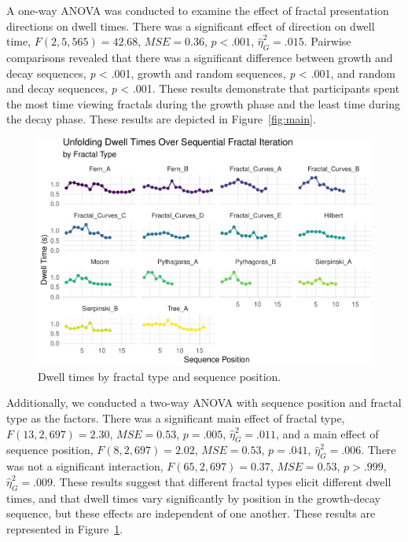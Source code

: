 \documentclass[english,jou]{apa6}
\begin{document}
A one-way ANOVA was conducted to examine the effect of fractal presentation directions on dwell times. There was a significant effect of direction on dwell time, \(F(2, 5,565) = 42.68\), \(\mathit{MSE} = 0.36\), \(p < .001\), \(\hat{\eta}^2_G = .015\). Pairwise comparisons revealed that there was a significant difference between growth and decay sequences, \emph{p} \textless{} .001, growth and random sequences, \emph{p} \textless{} .001, and random and decay sequences, \emph{p} \textless{} .001. These results demonstrate that participants spent the most time viewing fractals during the growth phase and the least time during the decay phase. These results are depicted in Figure~\ref{fig:main}.

\begin{figure}
\centering
\includegraphics{paper_papaja_files/figure-latex/ftfig-1.pdf}
\caption{\label{fig:ftfig}Dwell times by fractal type and sequence position.}
\end{figure}

Additionally, we conducted a two-way ANOVA with sequence position and fractal type as the factors. There was a significant main effect of fractal type, \(F(13, 2,697) = 2.30\), \(\mathit{MSE} = 0.53\), \(p = .005\), \(\hat{\eta}^2_G = .011\), and a main effect of sequence position, \(F(8, 2,697) = 2.02\), \(\mathit{MSE} = 0.53\), \(p = .041\), \(\hat{\eta}^2_G = .006\). There was not a significant interaction, \(F(65, 2,697) = 0.37\), \(\mathit{MSE} = 0.53\), \(p > .999\), \(\hat{\eta}^2_G = .009\). These results suggest that different fractal types elicit different dwell times, and that dwell times vary significantly by position in the growth-decay sequence, but these effects are independent of one another. These results are represented in Figure~\ref{fig:ftfig}.
\end{document}
